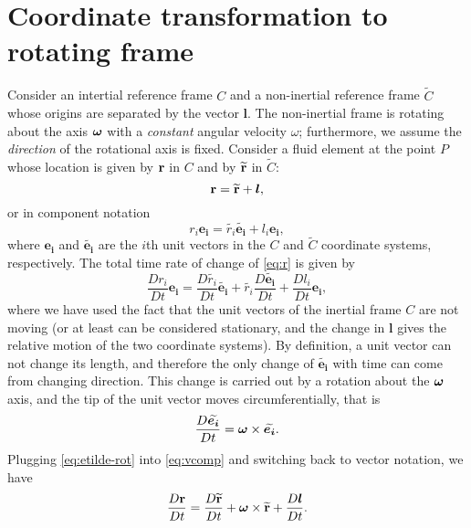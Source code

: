 \section{Coordinate transformation to rotating frame}
Consider an intertial reference frame \(C\) and a non-inertial
reference frame \(\widetilde{C}\) whose origins are separated by the
vector \(\boldsymbol{l}\).  The non-inertial frame is rotating about the axis
\(\boldsymbol{\omega}\) with a \emph{constant} angular velocity \(\omega\);
furthermore, we assume the \emph{direction} of the rotational axis is
fixed.  Consider a fluid element at the point \(P\) whose location is
given by \({\bf r}\) in \(C\) and by \(\widetilde{{\bf r}}\) in
\(\widetilde{C}\):
  \begin{equation}
    {\bf r} = \widetilde{{\bf r}} + \boldsymbol{l},
  \end{equation}
or in component notation
  \begin{equation}\label{eq:r}
    r_i\boldsymbol{e_i} = \widetilde{r_i}\widetilde{\boldsymbol{e_i}} + l_i\boldsymbol{e_i},
  \end{equation}
where \(\boldsymbol{e_i}\) and \(\widetilde{\boldsymbol{e_i}}\) are the \(i\)th unit
vectors in the \(C\) and \(\widetilde{C}\) coordinate systems,
respectively.  The total time rate of change of \ref{eq:r} is given by
  \begin{equation}\label{eq:vcomp}
    \frac{Dr_i}{Dt}\boldsymbol{e_i} = \frac{D\widetilde{r_i}}{Dt}\widetilde{\boldsymbol{e_i}} + \widetilde{r_i}\frac{D\widetilde{\boldsymbol{e_i}}}{Dt} + \frac{Dl_i}{Dt}\boldsymbol{e_i},
  \end{equation}
where we have used the fact that the unit vectors of the inertial
frame \(C\) are not moving (or at least can be considered stationary,
and the change in \(\boldsymbol{l}\) gives the relative motion of the two
coordinate systems).  By definition, a unit vector can not change its
length, and therefore the only change of \(\widetilde{\boldsymbol{e_i}}\) with
time can come from changing direction.  This change is carried out by
a rotation about the \(\boldsymbol{\omega}\) axis, and the tip of the unit
vector moves circumferentially, that is
  \begin{equation}\label{eq:etilde-rot}
    \frac{D\widetilde{\boldsymbol{e_i}}}{Dt} = \boldsymbol{\omega}\times\widetilde{\boldsymbol{e_i}}.
  \end{equation}
Plugging \ref{eq:etilde-rot} into \ref{eq:vcomp} and switching back to
vector notation, we have
  \begin{equation}\label{eq:r-dot}
    \frac{D{\bf r}}{Dt} = \frac{D\widetilde{{\bf r}}}{Dt} + \boldsymbol{\omega}\times\widetilde{{\bf r}} + \frac{D\boldsymbol{l}}{Dt}.
  \end{equation}
